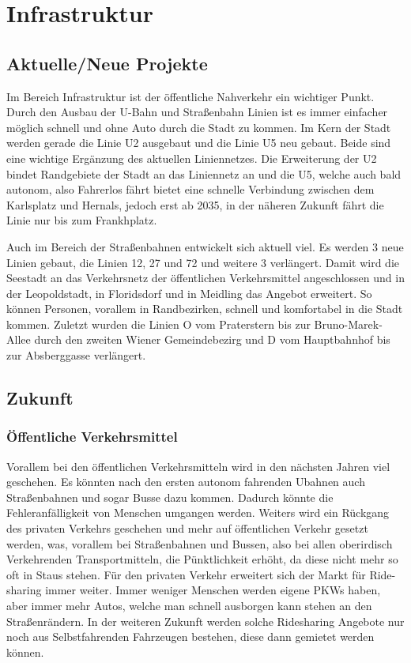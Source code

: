 \section{Infrastruktur}

\subsection{Aktuelle/Neue Projekte}

Im Bereich Infrastruktur ist der öffentliche Nahverkehr ein wichtiger Punkt. Durch den Ausbau der U-Bahn und Straßenbahn Linien ist es immer einfacher möglich schnell und ohne Auto durch die Stadt zu kommen. Im Kern der Stadt werden gerade die Linie U2 ausgebaut und die Linie U5 neu gebaut. Beide sind eine wichtige Ergänzung des aktuellen Liniennetzes. Die Erweiterung der U2 bindet Randgebiete der Stadt an das Liniennetz an und die U5, welche auch bald autonom, also Fahrerlos fährt bietet eine schnelle Verbindung zwischen dem Karlsplatz und Hernals, jedoch erst ab 2035, in der näheren Zukunft fährt die Linie nur bis zum Frankhplatz.

Auch im Bereich der Straßenbahnen entwickelt sich aktuell  viel. Es werden 3 neue Linien gebaut, die Linien 12, 27 und 72 und weitere 3 verlängert. Damit wird die Seestadt an das Verkehrsnetz der öffentlichen Verkehrsmittel angeschlossen und in der Leopoldstadt, in Floridsdorf und in Meidling das Angebot erweitert. So können Personen, vorallem in Randbezirken, schnell und komfortabel in die Stadt kommen. Zuletzt wurden die Linien O vom Praterstern bis zur Bruno-Marek-Allee durch den zweiten Wiener Gemeindebezirg und D vom Hauptbahnhof bis zur Absberggasse verlängert.

\subsection{Zukunft}

\subsubsection{Öffentliche Verkehrsmittel}

Vorallem bei den öffentlichen Verkehrsmitteln wird in den nächsten Jahren viel geschehen. Es könnten nach den ersten autonom fahrenden Ubahnen auch Straßenbahnen und sogar Busse dazu kommen. Dadurch könnte die Fehleranfälligkeit von Menschen umgangen werden. Weiters wird ein Rückgang des privaten Verkehrs geschehen und mehr auf öffentlichen Verkehr gesetzt werden, was, vorallem bei Straßenbahnen und Bussen, also bei allen oberirdisch Verkehrenden Transportmitteln, die Pünktlichkeit erhöht, da diese nicht mehr so oft in Staus stehen. Für den privaten Verkehr erweitert sich der Markt für Ride-sharing immer weiter. Immer weniger Menschen werden eigene PKWs haben, aber immer mehr Autos, welche man schnell ausborgen kann stehen an den Straßenrändern. In der weiteren Zukunft werden solche Ridesharing Angebote nur noch aus Selbstfahrenden Fahrzeugen bestehen, diese dann gemietet werden können.

